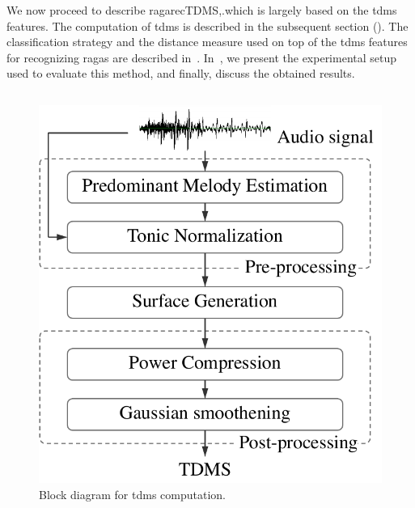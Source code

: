 We now proceed to describe \acrshort{ragarecTDMS},.which is largely based on the \gls{tdms} features. The computation of \gls{tdms} is described in the subsequent section (). The classification strategy and the distance measure used on top of the \gls{tdms} features for recognizing \glspl{raga} are described in~. In~, we present the experimental setup used to evaluate this method, and finally, discuss the obtained results. 

\subsection{}
\label{sec:tdms_feature_extraction}

\begin{figure}
	\begin{center}
		\includegraphics[width=\figSizeFifty]{ch07_ragaRecognition/figures/tdms_computation.pdf}
	\end{center}
	\caption{Block diagram for \gls{tdms} computation.}
	\label{fig:bd_tdms_computation}
\end{figure}

